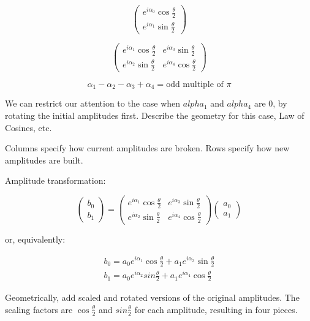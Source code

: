 \documentclass[11pt, letterpaper]{article}
\begin{document}
\begin{equation}
	\begin{pmatrix} e^{i\alpha_0}\cos\frac{\theta}{2}  \\  e^{i\alpha_1}\sin\frac{\theta}{2} \end{pmatrix}
\end{equation}

\begin{equation}
	\begin{pmatrix} e^{i\alpha_1}\cos\frac{\theta}{2} & e^{i\alpha_3}\sin\frac{\theta}{2}\\  e^{i\alpha_2}\sin\frac{\theta}{2} &  e^{i\alpha_4}\cos\frac{\theta}{2} \end{pmatrix}
\end{equation}

$$\alpha_1 - \alpha_2  - \alpha_3  + \alpha_4 = \text{odd multiple of }\pi$$

We can restrict our attention to the case when  $alpha_1$ and $alpha_4$ are $0$, by rotating the initial amplitudes first. Describe the geometry for this case, Law of Cosines, etc.

Columns specify how current amplitudes are broken. Rows specify how new amplitudes are built.

Amplitude transformation:

\begin{equation}
	\begin{pmatrix}b_0 \\ b_1 \end{pmatrix} =
		\begin{pmatrix} e^{i\alpha_1}\cos\frac{\theta}{2} & e^{i\alpha_3}\sin\frac{\theta}{2}\\  e^{i\alpha_2}\sin\frac{\theta}{2} &  e^{i\alpha_4}\cos\frac{\theta}{2} \end{pmatrix}
	\begin{pmatrix} a_0 \\ a_1 \end{pmatrix}
\end{equation}

or, equivalently:

\begin{eqnarray*}
	b_0 = a_0e^{i\alpha_1}\cos\frac{\theta}{2}  +  a_1e^{i\alpha_3}\sin\frac{\theta}{2} \\
	b_1 = a_0e^{i\alpha_2}sin\frac{\theta}{2} + a_1e^{i\alpha_4}\cos\frac{\theta}{2}
\end{eqnarray*}


Geometrically, add scaled and rotated versions of the original amplitudes. The scaling factors are  $\cos\frac{\theta}{2}$ and $sin\frac{\theta}{2}$ for each amplitude, resulting in four pieces.
\end{document}
